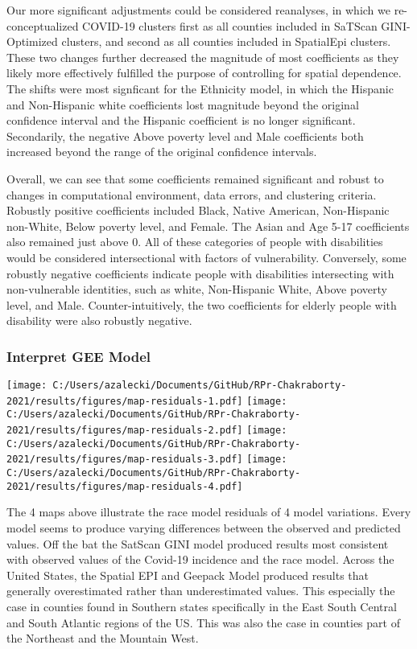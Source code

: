 \documentclass[
]{article}
\begin{document}
Our more significant adjustments could be considered reanalyses, in
which we re-conceptualized COVID-19 clusters first as all counties
included in SaTScan GINI-Optimized clusters, and second as all counties
included in SpatialEpi clusters. These two changes further decreased the
magnitude of most coefficients as they likely more effectively fulfilled
the purpose of controlling for spatial dependence. The shifts were most
signficant for the Ethnicity model, in which the Hispanic and
Non-Hispanic white coefficients lost magnitude beyond the original
confidence interval and the Hispanic coefficient is no longer
significant. Secondarily, the negative Above poverty level and Male
coefficients both increased beyond the range of the original confidence
intervals.

Overall, we can see that some coefficients remained significant and
robust to changes in computational environment, data errors, and
clustering criteria. Robustly positive coefficients included Black,
Native American, Non-Hispanic non-White, Below poverty level, and
Female. The Asian and Age 5-17 coefficients also remained just above 0.
All of these categories of people with disabilities would be considered
intersectional with factors of vulnerability. Conversely, some robustly
negative coefficients indicate people with disabilities intersecting
with non-vulnerable identities, such as white, Non-Hispanic White, Above
poverty level, and Male. Counter-intuitively, the two coefficients for
elderly people with disability were also robustly negative.

\hypertarget{interpret-gee-model}{%
\subsubsection{Interpret GEE Model}\label{interpret-gee-model}}

\texttt{[image: C:/Users/azalecki/Documents/GitHub/RPr-Chakraborty-2021/results/figures/map-residuals-1.pdf]}
\texttt{[image: C:/Users/azalecki/Documents/GitHub/RPr-Chakraborty-2021/results/figures/map-residuals-2.pdf]}
\texttt{[image: C:/Users/azalecki/Documents/GitHub/RPr-Chakraborty-2021/results/figures/map-residuals-3.pdf]}
\texttt{[image: C:/Users/azalecki/Documents/GitHub/RPr-Chakraborty-2021/results/figures/map-residuals-4.pdf]}

The 4 maps above illustrate the race model residuals of 4 model
variations. Every model seems to produce varying differences between the
observed and predicted values. Off the bat the SatScan GINI model
produced results most consistent with observed values of the Covid-19
incidence and the race model. Across the United States, the Spatial EPI
and Geepack Model produced results that generally overestimated rather
than underestimated values. This especially the case in counties found
in Southern states specifically in the East South Central and South
Atlantic regions of the US. This was also the case in counties part of
the Northeast and the Mountain West.
\end{document}
